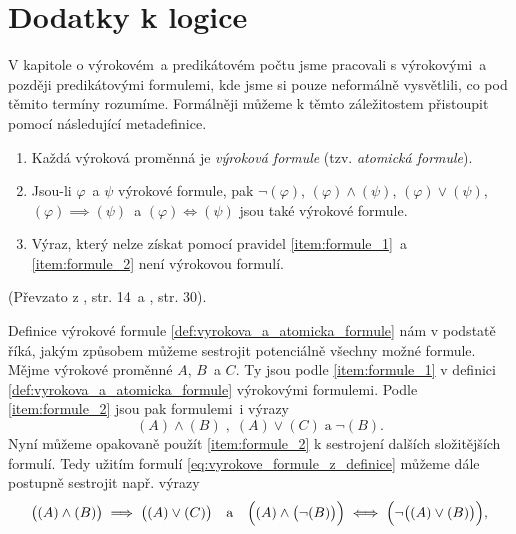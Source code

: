 \chapter{Dodatky k logice}\label{chap:dodatky_k_logice}
V kapitole o výrokovém~a predikátovém počtu jsme pracovali s výrokovými~a později predikátovými formulemi, kde jsme si pouze neformálně vysvětlili, co pod těmito termíny rozumíme. Formálněji můžeme k těmto záležitostem přistoupit pomocí následující metadefinice.
\begin{definition}\label{def:vyrokova_a_atomicka_formule}
    
    \begin{enumerate}[label=(\roman*)]
        \item\label{item:formule_1} Každá výroková proměnná je \emph{výroková formule} (tzv. \emph{atomická formule}).
        \item\label{item:formule_2} Jsou-li $\varphi$~a $\psi$ výrokové formule, pak $\neg (\varphi)$, $(\varphi) \land (\psi)$, $(\varphi) \lor (\psi)$, $(\varphi) \implies (\psi)$~a $(\varphi) \iff (\psi)$ jsou také výrokové formule.
        \item\label{item:formule_3} Výraz, který nelze získat pomocí pravidel \ref{item:formule_1}~a \ref{item:formule_2} není výrokovou formulí.
    \end{enumerate}
\end{definition}
(Převzato z \cite{Fuchs2003}, str. 14~a \cite{BalcarStepanek1986}, str. 30).\par
Definice výrokové formule \ref{def:vyrokova_a_atomicka_formule} nám v podstatě říká, jakým způsobem můžeme sestrojit potenciálně všechny možné formule. Mějme výrokové proměnné $A$, $B$~a $C$. Ty jsou podle \ref{item:formule_1} v definici \ref{def:vyrokova_a_atomicka_formule} výrokovými formulemi. Podle \ref{item:formule_2} jsou pak formulemi~i výrazy
\begin{equation}\label{eq:vyrokove_formule_z_definice}
    (A) \land (B)\;,\;(A) \lor (C)\;\text{a}\;\neg(B).
\end{equation}
Nyní můžeme opakovaně použít \ref{item:formule_2} k sestrojení dalších složitějších formulí. Tedy užitím formulí \eqref{eq:vyrokove_formule_z_definice} můžeme dále postupně sestrojit např. výrazy
\begin{equation*}
    \bigl((A) \land (B)\bigr) \implies \bigl((A) \lor (C)\bigr)\quad\text{a}\quad\Bigl((A) \land \bigl(\neg(B)\bigr)\Bigr) \iff \Bigl(\neg\bigl((A) \lor (B)\bigr)\Bigr),
\end{equation*}
